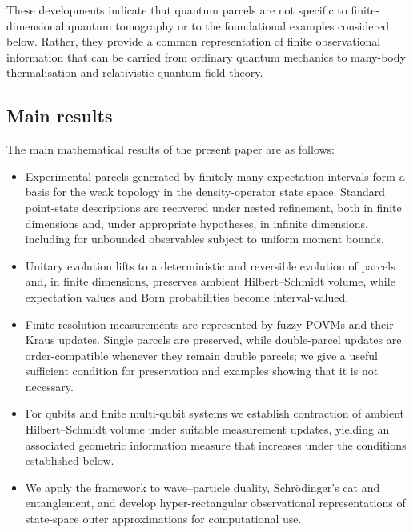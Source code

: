 \documentclass[11pt, onecolumn]{article}
\begin{document}
These developments indicate that quantum parcels are not specific to
finite-dimensional quantum tomography or to the foundational examples
considered below. Rather, they provide a common representation of finite
observational information that can be carried from ordinary quantum
mechanics to many-body thermalisation and relativistic quantum field theory.

%

\subsection{Main results}

The main mathematical results of the present paper are as follows:
\begin{itemize}

\item Experimental parcels generated by finitely many expectation intervals
form a basis for the weak topology in the density-operator state space.
Standard point-state descriptions are recovered under nested refinement,
both in finite dimensions and, under appropriate hypotheses, in infinite
dimensions, including for unbounded observables subject to uniform moment
bounds.

\item Unitary evolution lifts to a deterministic and reversible evolution of
parcels and, in finite dimensions, preserves ambient Hilbert--Schmidt volume,
while expectation values and Born probabilities become interval-valued.

\item Finite-resolution measurements are represented by fuzzy POVMs and
their Kraus updates. Single parcels are preserved, while double-parcel
updates are order-compatible whenever they remain double parcels; we give a
useful sufficient condition for preservation and examples showing that it
is not necessary.

\item For qubits and finite multi-qubit systems we establish contraction of
ambient Hilbert--Schmidt volume under suitable measurement updates, yielding
an associated geometric information measure that increases under the
conditions established below.

\item We apply the framework to wave--particle duality, Schr\"odinger's cat
and entanglement, and develop hyper-rectangular observational
representations of state-space outer approximations for computational use.

\end{itemize}
\end{document}
